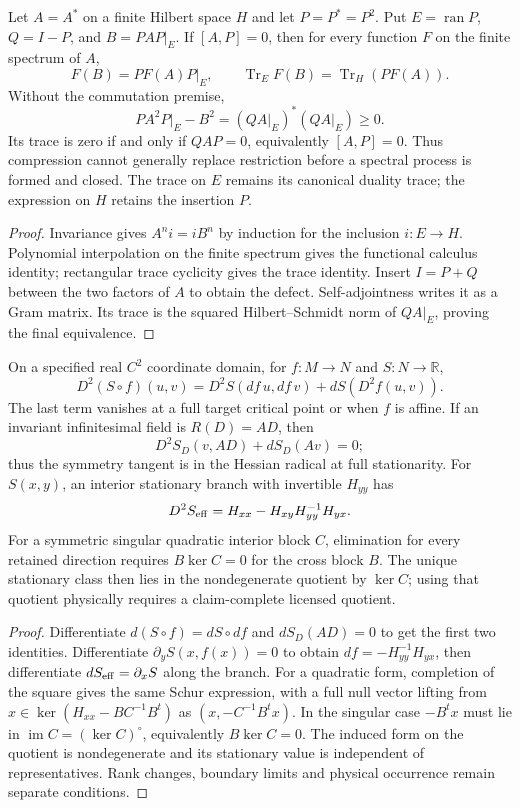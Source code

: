 \documentclass[11pt,a4paper]{article}
\begin{document}
\begin{lemma}
\label{p2a:lem:repair-restricted-trace}
Let $A=A^*$ on a finite Hilbert space $H$ and let $P=P^*=P^2$.
Put $E=\operatorname{ran}P$, $Q=I-P$, and $B=PAP|_E$.
If $[A,P]=0$, then for every function $F$ on the finite spectrum of $A$,
\[
 F(B)=PF(A)P|_E,\qquad
 \operatorname{Tr}_E F(B)=\operatorname{Tr}_H(PF(A)).
\]
Without the commutation premise,
\[
 PA^2P|_E-B^2=(QA|_E)^*(QA|_E)\ge0.
\]
Its trace is zero if and only if $QAP=0$, equivalently $[A,P]=0$.
Thus compression cannot generally replace restriction before a spectral
process is formed and closed. The trace on $E$ remains its canonical
duality trace; the expression on $H$ retains the insertion $P$.
\end{lemma}
\begin{proof}
Invariance gives $A^ni=iB^n$ by induction for the inclusion $i:E\to H$.
Polynomial interpolation on the finite spectrum gives the functional
calculus identity; rectangular trace cyclicity gives the trace identity.
Insert $I=P+Q$ between the two factors of $A$ to obtain the defect.
Self-adjointness writes it as a Gram matrix. Its trace is the squared
Hilbert--Schmidt norm of $QA|_E$, proving the final equivalence.
\end{proof}

\begin{lemma}
\label{p2a:lem:repair-hessian-schur-transport}
On a specified real $C^2$ coordinate domain, for $f:M\to N$ and $S:N\to\mathbb R$,
\[
 D^2(S\circ f)(u,v)=D^2S(df\,u,df\,v)+dS(D^2f(u,v)).
\]
The last term vanishes at a full target critical point or when $f$ is affine.
If an invariant infinitesimal field is $R(D)=AD$, then
\[
 D^2S_D(v,AD)+dS_D(Av)=0;
\]
thus the symmetry tangent is in the Hessian radical at full stationarity.
For $S(x,y)$, an interior stationary branch with invertible $H_{yy}$ has
\[
 D^2S_{\rm eff}=H_{xx}-H_{xy}H_{yy}^{-1}H_{yx}.
\]
For a symmetric singular quadratic interior block $C$, elimination for every
retained direction requires $B\ker C=0$ for the cross block $B$. The unique
stationary class then lies in the nondegenerate quotient by $\ker C$;
using that quotient physically requires a claim-complete licensed quotient.
\end{lemma}
\begin{proof}
Differentiate $d(S\circ f)=dS\circ df$ and $dS_D(AD)=0$ to get the first
two identities. Differentiate $\partial_yS(x,f(x))=0$ to obtain
$df=-H_{yy}^{-1}H_{yx}$, then differentiate
$dS_{\rm eff}=\partial_xS$ along the branch. For a quadratic form,
completion of the square gives the same Schur expression, with a full null
vector lifting from $x\in\ker(H_{xx}-BC^{-1}B^t)$ as
$(x,-C^{-1}B^tx)$. In the singular case $-B^tx$ must lie in
$\operatorname{im}C=(\ker C)^\circ$, equivalently $B\ker C=0$.
The induced form on the quotient is nondegenerate and its stationary value
is independent of representatives. Rank changes, boundary limits and
physical occurrence remain separate conditions.
\end{proof}
\end{document}

